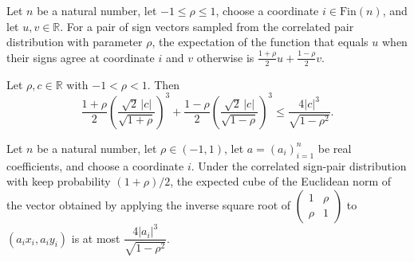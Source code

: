 \begin{theorem}
\label{FABL.pmfExpectation_if_coordinate_signs_eq}
\leanok
{}
Let $n$ be a natural number, let $-1\leq\rho\leq1$, choose a coordinate
$i\in\mathrm{Fin}(n)$, and let $u,v\in\mathbb{R}$. For a pair of sign vectors sampled
from the correlated pair distribution with parameter $\rho$, the expectation of the
function that equals $u$ when their signs agree at coordinate $i$ and $v$ otherwise is
$\frac{1+\rho}{2}u+\frac{1-\rho}{2}v$.
\end{theorem}

\begin{theorem}
\label{FABL.weighted_whitening_scale_cube_le}
\leanok
{}
Let $\rho,c\in\mathbb{R}$ with $-1<\rho<1$. Then
\[\frac{1+\rho}{2}\left(\frac{\sqrt{2}\,|c|}{\sqrt{1+\rho}}\right)^3+\frac{1-\rho}{2}\left(\frac{\sqrt{2}\,|c|}{\sqrt{1-\rho}}\right)^3\leq\frac{4|c|^3}{\sqrt{1-\rho^2}}.\]
\end{theorem}

\begin{theorem}
\label{FABL.integral_regularThresholdPairSummand_whitening_cube_le}
\leanok
{}
Let $n$ be a natural number, let $\rho\in(-1,1)$, let $a=(a_i)_{i=1}^n$ be real
coefficients, and choose a coordinate $i$. Under the correlated sign-pair distribution
with keep probability $(1+\rho)/2$, the expected cube of the Euclidean norm of the
vector obtained by applying the inverse square root of
$\begin{pmatrix}1&\rho\\\rho&1\end{pmatrix}$ to $(a_i x_i,a_i y_i)$ is at most
$\dfrac{4|a_i|^3}{\sqrt{1-\rho^2}}$.
\end{theorem}


